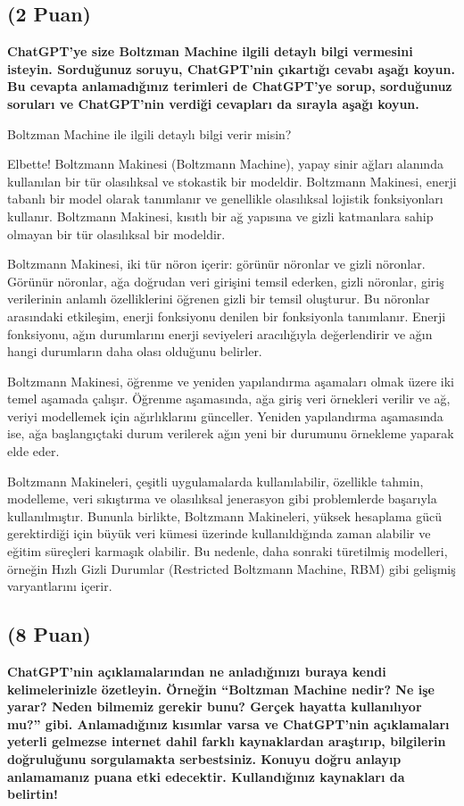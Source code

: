 \documentclass[11pt]{article}
\begin{document}
\subsection{(2 Puan)} \textbf{ChatGPT’ye size Boltzman Machine ilgili detaylı bilgi vermesini isteyin. Sorduğunuz soruyu, ChatGPT'nin çıkartığı cevabı aşağı koyun. Bu cevapta anlamadığınız terimleri de ChatGPT’ye sorup, sorduğunuz soruları ve ChatGPT’nin verdiği cevapları da sırayla aşağı koyun.}

Boltzman Machine ile ilgili detaylı bilgi verir misin?

Elbette! Boltzmann Makinesi (Boltzmann Machine), yapay sinir ağları alanında kullanılan bir tür olasılıksal ve stokastik bir modeldir. Boltzmann Makinesi, enerji tabanlı bir model olarak tanımlanır ve genellikle olasılıksal lojistik fonksiyonları kullanır. Boltzmann Makinesi, kısıtlı bir ağ yapısına ve gizli katmanlara sahip olmayan bir tür olasılıksal bir modeldir.

Boltzmann Makinesi, iki tür nöron içerir: görünür nöronlar ve gizli nöronlar. Görünür nöronlar, ağa doğrudan veri girişini temsil ederken, gizli nöronlar, giriş verilerinin anlamlı özelliklerini öğrenen gizli bir temsil oluşturur. Bu nöronlar arasındaki etkileşim, enerji fonksiyonu denilen bir fonksiyonla tanımlanır. Enerji fonksiyonu, ağın durumlarını enerji seviyeleri aracılığıyla değerlendirir ve ağın hangi durumların daha olası olduğunu belirler.

Boltzmann Makinesi, öğrenme ve yeniden yapılandırma aşamaları olmak üzere iki temel aşamada çalışır. Öğrenme aşamasında, ağa giriş veri örnekleri verilir ve ağ, veriyi modellemek için ağırlıklarını günceller. Yeniden yapılandırma aşamasında ise, ağa başlangıçtaki durum verilerek ağın yeni bir durumunu örnekleme yaparak elde eder.

Boltzmann Makineleri, çeşitli uygulamalarda kullanılabilir, özellikle tahmin, modelleme, veri sıkıştırma ve olasılıksal jenerasyon gibi problemlerde başarıyla kullanılmıştır. Bununla birlikte, Boltzmann Makineleri, yüksek hesaplama gücü gerektirdiği için büyük veri kümesi üzerinde kullanıldığında zaman alabilir ve eğitim süreçleri karmaşık olabilir. Bu nedenle, daha sonraki türetilmiş modelleri, örneğin Hızlı Gizli Durumlar (Restricted Boltzmann Machine, RBM) gibi gelişmiş varyantlarını içerir.

\subsection{(8 Puan)} \textbf{ChatGPT’nin açıklamalarından ne anladığınızı buraya kendi kelimelerinizle özetleyin. Örneğin ``Boltzman Machine nedir? Ne işe yarar? Neden bilmemiz gerekir bunu? Gerçek hayatta kullanılıyor mu?'' gibi. Anlamadığınız kısımlar varsa ve ChatGPT’nin açıklamaları yeterli gelmezse internet dahil farklı kaynaklardan araştırıp, bilgilerin doğruluğunu sorgulamakta serbestsiniz. Konuyu doğru anlayıp anlamamanız puana etki edecektir. Kullandığınız kaynakları da belirtin!}
\end{document}

